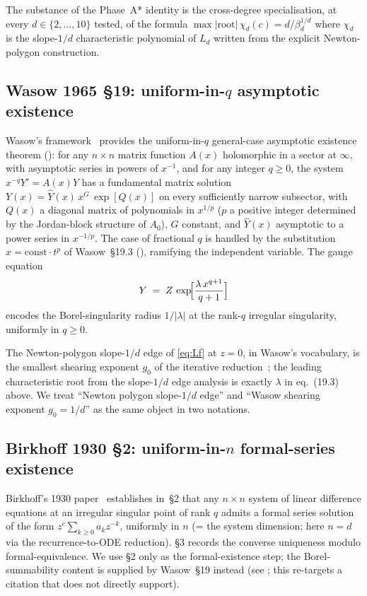 \documentclass[11pt,reqno]{amsart}
\theoremstyle{plain}
\theoremstyle{definition}
\theoremstyle{remark}
\begin{document}
The substance of the Phase~A* identity is the cross-degree
specialisation, at every $d \in \{2,\ldots,10\}$ tested, of the
formula $\max|\mathrm{root}|\,\chi_d(c) = d/\beta_d^{1/d}$ where
$\chi_d$ is the slope-$1/d$ characteristic polynomial of $L_d$
written from the explicit Newton-polygon construction.

\subsection{Wasow 1965 \texorpdfstring{\S19}{S19}: uniform-in-$q$ asymptotic existence}
\label{ssec:wasow}

Wasow's framework~\cite{wasow1965asymptotic} provides the
uniform-in-$q$ general-case asymptotic existence theorem
(\cite[\S19, Thm.~19.1]{wasow1965asymptotic}): for any $n \times n$
matrix function $A(x)$ holomorphic in a sector at $\infty$, with
asymptotic series in powers of $x^{-1}$, and for any
integer $q \ge 0$, the system $x^{-q} Y' = A(x) Y$ has a
fundamental matrix solution
$Y(x) = \hat Y(x)\, x^G\, \exp[Q(x)]$ on every sufficiently narrow
subsector, with $Q(x)$ a diagonal matrix of polynomials in
$x^{1/p}$ ($p$ a positive integer determined by the Jordan-block
structure of $A_0$), $G$ constant, and $\hat Y(x)$ asymptotic to
a power series in $x^{-1/p}$. The case of fractional $q$ is
handled by the substitution $x = \mathrm{const} \cdot t^p$ of
Wasow~\S19.3 (\cite[\S19.3, eq.~(19.26)]{wasow1965asymptotic}),
ramifying the independent variable. The gauge equation
\cite[\S19.1, eq.~(19.3)]{wasow1965asymptotic}
\[
  Y \;=\; Z\,\exp\!\Bigl[\frac{\lambda\,x^{q+1}}{q+1}\Bigr]
\]
encodes the Borel-singularity radius $1/|\lambda|$ at the
rank-$q$ irregular singularity, uniformly in $q \ge 0$.

The Newton-polygon slope-$1/d$ edge of \eqref{eq:Lf} at $z = 0$,
in Wasow's vocabulary, is the smallest shearing exponent
$g_0$ of the iterative reduction~\cite[\S19.3]{wasow1965asymptotic};
the leading characteristic root from the slope-$1/d$ edge
analysis is exactly $\lambda$ in eq.~(19.3) above. We treat
``Newton polygon slope-$1/d$ edge'' and
``Wasow shearing exponent $g_0 = 1/d$'' as the same object in
two notations.

\subsection{Birkhoff 1930 \texorpdfstring{\S2}{S2}: uniform-in-$n$ formal-series existence}
\label{ssec:birkhoff}

Birkhoff's 1930 paper~\cite{birkhoff1930formal} establishes
in~\S2 that any $n \times n$ system of linear difference equations
at an irregular singular point of rank $q$ admits a formal series
solution of the form $z^c \sum_{k\ge 0} a_k z^{-k}$, uniformly in
$n$ (= the system dimension; here $n = d$ via the recurrence-to-ODE
reduction). \S3 records the converse uniqueness modulo
formal-equivalence. We use \S2 only as the formal-existence step;
the Borel-summability content is supplied by Wasow~\S19 instead
(see ; this re-targets a citation that
\cite[\S2]{birkhoff1930formal} does not directly support).
\end{document}
